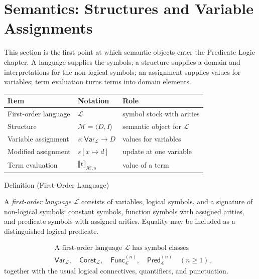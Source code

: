 
\section{Semantics: Structures and Variable Assignments}

\begin{remark*}
This section is the first point at which semantic objects enter the Predicate
Logic chapter. A language supplies the symbols; a structure supplies a domain
and interpretations for the non-logical symbols; an assignment supplies values
for variables; term evaluation turns terms into domain elements.

\begin{center}
\small
\begin{tabular}{l l l}
\toprule
\textbf{Item} & \textbf{Notation} & \textbf{Role} \\
\midrule
First-order language & \(\mathcal L\) & symbol stock with arities \\
Structure & \(\mathcal M=\langle D,I\rangle\) & semantic object for \(\mathcal L\) \\
Variable assignment & \(s:\mathsf{Var}_{\mathcal L}\to D\) & values for variables \\
Modified assignment & \(s[x\mapsto d]\) & update at one variable \\
Term evaluation & \(\llbracket t\rrbracket_{\mathcal M,s}\) & value of a term \\
\bottomrule
\end{tabular}
\end{center}
\end{remark*}

\begin{definitionbox}{Definition (First-Order Language)}
\begin{definition}
\label{def:fo-language}
A \emph{first-order language} \(\mathcal L\) consists of variables, logical
symbols, and a signature of non-logical symbols: constant symbols, function
symbols with assigned arities, and predicate symbols with assigned arities.
Equality may be included as a distinguished logical predicate.
\end{definition}
\end{definitionbox}

\begin{remark*}
\[
\begin{aligned}
&\text{A first-order language } \mathcal L \text{ has symbol classes}\\
&\mathsf{Var}_{\mathcal L},\quad
\mathsf{Const}_{\mathcal L},\quad
\mathsf{Func}_{\mathcal L}^{(n)},\quad
\mathsf{Pred}_{\mathcal L}^{(n)}
\quad(n\geq 1),
\end{aligned}
\]
together with the usual logical connectives, quantifiers, and punctuation.
\end{remark*}

